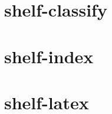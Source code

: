 \documentclass[12pt, openany]{book}
\begin{document}





\part{shelf-classify}




\part{shelf-index}




\part{shelf-latex}





\appendix


\end{document}
